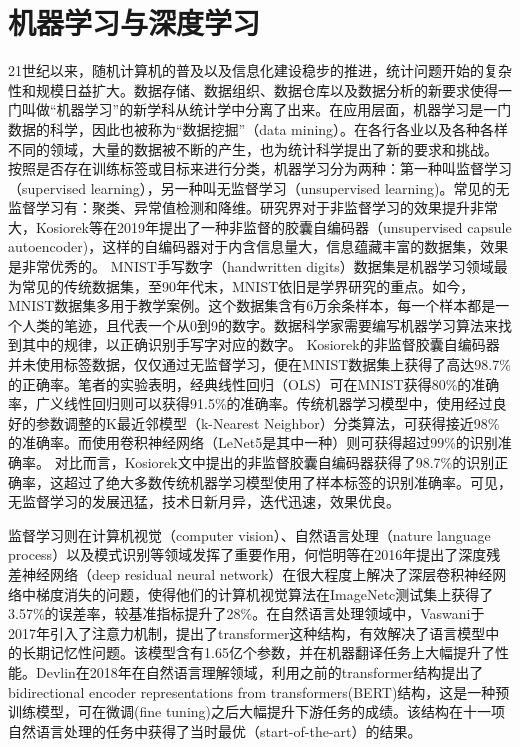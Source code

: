 \documentclass[twoside,longtitle]{LZUthesis}
\begin{document}
\section{机器学习与深度学习}
21世纪以来，随机计算机的普及以及信息化建设稳步的推进，统计问题开始的复杂性和规模日益扩大。数据存储、数据组织、数据仓库以及数据分析的新要求使得一门叫做“机器学习”的新学科从统计学中分离了出来。在应用层面，机器学习是一门数据的科学，因此也被称为“数据挖掘”（data mining）。在各行各业以及各种各样不同的领域，大量的数据被不断的产生，也为统计科学提出了新的要求和挑战。
按照是否存在训练标签或目标来进行分类，机器学习分为两种：第一种叫监督学习（supervised learning），另一种叫无监督学习（unsupervised learning)。常见的无监督学习有：聚类、异常值检测和降维。研究界对于非监督学习的效果提升非常大，Kosiorek等在2019年提出了一种非监督的胶囊自编码器（unsupervised capsule autoencoder)\cite{kosiorek2019stacked}，这样的自编码器对于内含信息量大，信息蕴藏丰富的数据集，效果是非常优秀的。
MNIST手写数字（handwritten digits）数据集是机器学习领域最为常见的传统数据集，至90年代末，MNIST依旧是学界研究的重点。如今，MNIST数据集多用于教学案例。这个数据集含有6万余条样本，每一个样本都是一个人类的笔迹，且代表一个从0到9的数字。数据科学家需要编写机器学习算法来找到其中的规律，以正确识别手写字对应的数字。
Kosiorek的非监督胶囊自编码器并未使用标签数据，仅仅通过无监督学习，便在MNIST数据集上获得了高达98.7\%的正确率。笔者的实验表明，经典线性回归（OLS）可在MNIST获得80\%的准确率，广义线性回归则可以获得91.5\%的准确率。传统机器学习模型中，使用经过良好的参数调整的K最近邻模型（k-Nearest Neighbor）分类算法，可获得接近98\%的准确率。而使用卷积神经网络（LeNet5是其中一种）则可获得超过99\%的识别准确率。
对比而言，Kosiorek文中提出的非监督胶囊自编码器获得了98.7\%的识别正确率，这超过了绝大多数传统机器学习模型使用了样本标签的识别准确率。可见，无监督学习的发展迅猛，技术日新月异，迭代迅速，效果优良。

监督学习则在计算机视觉（computer vision）、自然语言处理（nature language process）以及模式识别等领域发挥了重要作用，何恺明等在2016年提出了深度残差神经网络（deep residual neural network）在很大程度上解决了深层卷积神经网络中梯度消失的问题\cite{he2016deep}，使得他们的计算机视觉算法在ImageNetc测试集上获得了3.57\%的误差率，较基准指标提升了28\%。在自然语言处理领域中，Vaswani于2017年引入了注意力机制\cite{vaswani2017attention}，提出了transformer这种结构，有效解决了语言模型中的长期记忆性问题。该模型含有1.65亿个参数，并在机器翻译任务上大幅提升了性能。Devlin在2018年在自然语言理解领域，利用之前的transformer结构提出了bidirectional encoder representations from transformers(BERT)结构，这是一种预训练模型，可在微调(fine tuning)之后大幅提升下游任务的成绩。该结构在十一项自然语言处理的任务中获得了当时最优（start-of-the-art）的结果。
\end{document}
